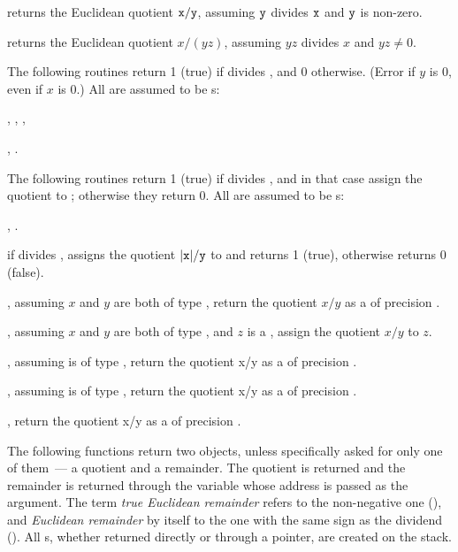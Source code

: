  returns the Euclidean quotient
${\tt x} / {\tt y}$, assuming ${\tt y}$ divides
${\tt x}$ and ${\tt y}$ is non-zero.

 returns the Euclidean
quotient $x/(yz)$, assuming $yz$ divides $x$ and $yz \neq 0$.

The following routines return 1 (true) if  divides , and
0 otherwise. (Error if $y$ is $0$, even if $x$ is $0$.) All  are
assumed to be s:

,
,
,

,
.

The following routines return 1 (true) if  divides , and in
that case assign the quotient to ; otherwise they return 0. All
 are assumed to be s:

,
.

 if  divides , assigns
the quotient $|{\tt x}|/{\tt y}$ to  and returns 1 (true), otherwise
returns 0 (false).


, assuming $x$ and $y$
are both of type , return the quotient $x/y$ as a  of
precision .

, assuming $x$ and $y$
are both of type , and $z$ is a ,
assign the quotient $x/y$ to $z$.

, assuming 
is of type , return the quotient x/y as a  of
precision .

, assuming 
is of type , return the quotient x/y as a  of
precision .

, return the quotient x/y as a
 of precision .


 The following functions return two objects,
unless specifically asked for only one of them~--- a quotient and a remainder.
The quotient is returned and the remainder is returned through the variable
whose address is passed as the  argument. The term \emph{true
Euclidean remainder} refers to the non-negative one (), and
\emph{Euclidean remainder} by itself to the one with the same sign as the
dividend (). All s, whether returned directly or through a
pointer, are created on the stack.

